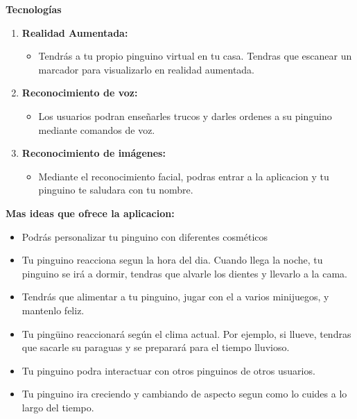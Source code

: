 \documentclass{article}
\begin{document}
\raggedright
\textbf{Tecnologías}
\begin{enumerate}
	\item \textbf{Realidad Aumentada:}
	  \begin{itemize}
		\item Tendrás a tu propio pinguino virtual en tu casa. Tendras que escanear un marcador para visualizarlo en realidad aumentada. 
	  \end{itemize}
  
	\item \textbf{Reconocimiento de voz:}
	  \begin{itemize}
		\item Los usuarios podran enseñarles trucos y darles ordenes a su pinguino mediante comandos de voz.
	  \end{itemize}
  
	\item \textbf{Reconocimiento de imágenes:}
	  \begin{itemize}
		\item Mediante el reconocimiento facial, podras entrar a la aplicacion y tu pinguino te saludara con tu nombre.
	  \end{itemize}
  
  \end{enumerate}

\vspace*{1\baselineskip}


\textbf{Mas ideas que ofrece la aplicacion:}
	\begin{itemize}
	\item Podrás personalizar tu pinguino con diferentes cosméticos
	\item Tu pinguino reacciona segun la hora del dia. Cuando llega la noche, tu pinguino se irá a dormir, tendras que alvarle los dientes y llevarlo a la cama.
	\item Tendrás que alimentar a tu pinguino, jugar con el a varios minijuegos, y mantenlo feliz.
	\item Tu pingüino reaccionará según el clima actual. Por ejemplo, si llueve, tendras que sacarle su paraguas y se preparará para el tiempo lluvioso.
	\item Tu pinguino podra interactuar con otros pinguinos de otros usuarios.
	\item Tu pinguino ira creciendo y cambiando de aspecto segun como lo cuides a lo largo del tiempo.
  \end{itemize}





  
  
  
\pagebreak



\clearpage
\end{document}
